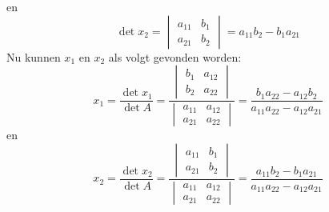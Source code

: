 en
%
\begin{equation}
\det x_2 = \begin{vmatrix}
a_{11} & b_{1} \\
a_{21} & b_{2}
\end{vmatrix} = a_{11}b_{2} - b_{1}a_{21}
\end{equation}
%
Nu kunnen $x_1$ en $x_2$ als volgt gevonden worden:
%
\begin{equation}
x_1 = \dfrac{\det x_1}{\det A} = \dfrac{\begin{vmatrix}
b_{1} & a_{12} \\
b_{2} & a_{22}
\end{vmatrix}}{\begin{vmatrix}
a_{11} & a_{12} \\
a_{21} & a_{22}
\end{vmatrix}} = \dfrac{b_{1}a_{22} - a_{12}b_{2}}{a_{11}a_{22} - a_{12}a_{21}}
\end{equation}
%
en
%
\begin{equation}
x_2 = \dfrac{\det x_2}{\det A} = \dfrac{\begin{vmatrix}
a_{11} & b_{1} \\
a_{21} & b_{2}
\end{vmatrix}}{\begin{vmatrix}
a_{11} & a_{12} \\
a_{21} & a_{22}
\end{vmatrix}} = \dfrac{a_{11}b_{2} - b_{1}a_{21}}{a_{11}a_{22} - a_{12}a_{21}}
\end{equation}

